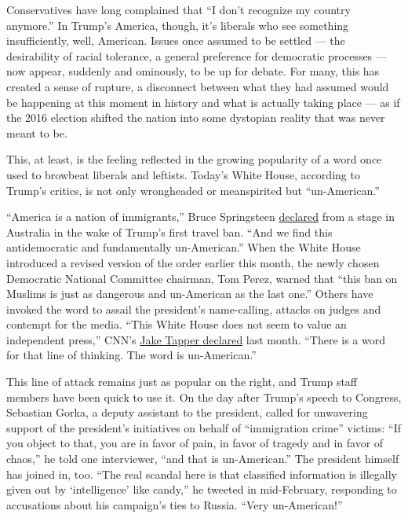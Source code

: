Conservatives have long complained that ``I don't recognize my country
anymore.'' In Trump's America, though, it's liberals who see something
insufficiently, well, American. Issues once assumed to be settled ---
the desirability of racial tolerance, a general preference for
democratic processes --- now appear, suddenly and ominously, to be up
for debate. For many, this has created a sense of rupture, a disconnect
between what they had assumed would be happening at this moment in
history and what is actually taking place --- as if the 2016 election
shifted the nation into some dystopian reality that was never meant to
be.

This, at least, is the feeling reflected in the growing popularity of a
word once used to browbeat liberals and leftists. Today's White House,
according to Trump's critics, is not only wrongheaded or meanspirited
but ``un-American.''

``America is a nation of immigrants,'' Bruce Springsteen
\href{http://www.rollingstone.com/music/news/bruce-springsteen-slams-trump-america-is-a-nation-of-immigrants-w463952}{declared}
from a stage in Australia in the wake of Trump's first travel ban. ``And
we find this antidemocratic and fundamentally un-American.'' When the
White House introduced a revised version of the order earlier this
month, the newly chosen Democratic National Committee chairman, Tom
Perez, warned that ``this ban on Muslims is just as dangerous and
un-American as the last one.'' Others have invoked the word to assail
the president's name-calling, attacks on judges and contempt for the
media. ``This White House does not seem to value an independent press,''
CNN's
\href{http://www.cnn.com/2017/02/24/politics/jake-tapper-white-house-trump-unamerican-cnntv/index.html}{Jake
Tapper declared} last month. ``There is a word for that line of
thinking. The word is un-American.''

This line of attack remains just as popular on the right, and Trump
staff members have been quick to use it. On the day after Trump's speech
to Congress, Sebastian Gorka, a deputy assistant to the president,
called for unwavering support of the president's initiatives on behalf
of ``immigration crime'' victims: ``If you object to that, you are in
favor of pain, in favor of tragedy and in favor of chaos,'' he told one
interviewer, ``and that is un-American.'' The president himself has
joined in, too. ``The real scandal here is that classified information
is illegally given out by `intelligence' like candy,'' he tweeted in
mid-February, responding to accusations about his campaign's ties to
Russia. ``Very un-American!''

